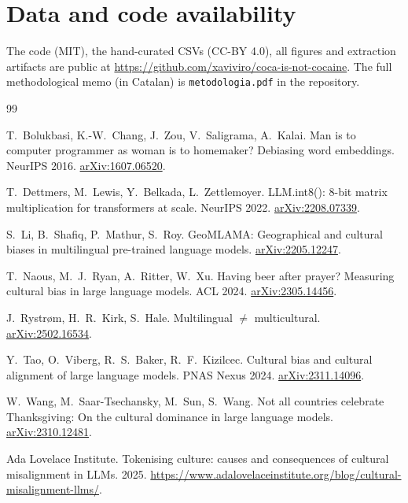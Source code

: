 \documentclass[10pt,twocolumn,a4paper]{article}
\newcommand{\code}[1]{\texttt{\small #1}}
\begin{document}
\section*{Data and code availability}

The code (MIT), the hand-curated CSVs (CC-BY 4.0), all figures and extraction
artifacts are public at
\url{https://github.com/xaviviro/coca-is-not-cocaine}. The full methodological
memo (in Catalan) is \code{metodologia.pdf} in the repository.

\balance
\begin{thebibliography}{99}
\small

T.~Bolukbasi, K.-W.~Chang, J.~Zou, V.~Saligrama, A.~Kalai.
\newblock Man is to computer programmer as woman is to homemaker? Debiasing
  word embeddings.
\newblock NeurIPS 2016. \href{https://arxiv.org/abs/1607.06520}{arXiv:1607.06520}.

T.~Dettmers, M.~Lewis, Y.~Belkada, L.~Zettlemoyer.
\newblock LLM.int8(): 8-bit matrix multiplication for transformers at scale.
\newblock NeurIPS 2022. \href{https://arxiv.org/abs/2208.07339}{arXiv:2208.07339}.

S.~Li, B.~Shafiq, P.~Mathur, S.~Roy.
\newblock GeoMLAMA: Geographical and cultural biases in multilingual
  pre-trained language models.
\newblock \href{https://arxiv.org/abs/2205.12247}{arXiv:2205.12247}.

T.~Naous, M.~J.~Ryan, A.~Ritter, W.~Xu.
\newblock Having beer after prayer? Measuring cultural bias in large language
  models.
\newblock ACL 2024. \href{https://arxiv.org/abs/2305.14456}{arXiv:2305.14456}.

J.~Rystrøm, H.~R.~Kirk, S.~Hale.
\newblock Multilingual $\neq$ multicultural.
\newblock \href{https://arxiv.org/abs/2502.16534}{arXiv:2502.16534}.

Y.~Tao, O.~Viberg, R.~S.~Baker, R.~F.~Kizilcec.
\newblock Cultural bias and cultural alignment of large language models.
\newblock PNAS Nexus 2024. \href{https://arxiv.org/abs/2311.14096}{arXiv:2311.14096}.

W.~Wang, M.~Saar-Tsechansky, M.~Sun, S.~Wang.
\newblock Not all countries celebrate Thanksgiving: On the cultural dominance
  in large language models.
\newblock \href{https://arxiv.org/abs/2310.12481}{arXiv:2310.12481}.

Ada Lovelace Institute.
\newblock Tokenising culture: causes and consequences of cultural
  misalignment in LLMs. 2025.
\newblock \url{https://www.adalovelaceinstitute.org/blog/cultural-misalignment-llms/}.

\end{thebibliography}
\end{document}
